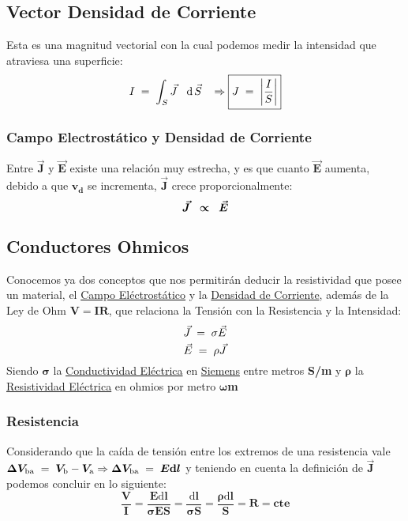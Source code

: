 \subsection{Vector Densidad de Corriente}
\noindent Esta es una magnitud vectorial con la cual podemos medir la intensidad que atraviesa una superficie:
\[
        I \hspace{1mm} = \hspace{1mm} \int_{S} \vec{J}\hspace{3mm}\mathrm{d}\hspace{.5mm}\vec{S}\hspace{3mm}\Rightarrow  \boxed{J\hspace{1mm} = \hspace{1mm} \left | \frac{I}{S} \right |}
\]
\subsubsection{Campo Electrostático y Densidad de Corriente}
\noindent Entre \(\bm{\vec{J}}\) y \(\bm{\vec{E}}\) existe una relación muy estrecha, y es que cuanto \(\bm{\vec{E}}\) aumenta, debido a que \(\bm{v_d}\) se incrementa, \(\bm{\vec{J}}\) crece proporcionalmente:
\[
        \bm{\vec{J}} \hspace{2mm} \bm{\propto} \hspace{2mm} \bm{\vec{E}}
\]
\subsection{Conductores Ohmicos}
\noindent Conocemos ya dos conceptos que nos permitirán deducir la resistividad que posee un material, el \underline{Campo Eléctrostático} y la \underline{Densidad de Corriente}, además de la Ley de Ohm \(\bm{V = IR}\), que relaciona la Tensión con la Resistencia y la Intensidad:
\[
        \vec{J} \hspace{1mm} = \hspace{1mm} \sigma \vec{E}
\]
\[
        \vec{E} \hspace{1mm} = \hspace{1mm} \rho \vec{J}
\]
Siendo \(\bm{\sigma}\) la \underline{Conductividad Eléctrica} en \underline{Siemens} entre metros \textbf{S/m} y \(\bm{\rho}\) la \underline{Resistividad Eléctrica} en ohmios por metro \(\bm{\omega}\)\textbf{m}
\subsubsection{Resistencia}
\noindent Considerando que la caída de tensión entre los extremos de una resistencia vale \\ \(\bm{\Delta V_{\textnormal{ba}}} \hspace{1mm}= \hspace{1mm} \bm{V_\textnormal{b}} -\bm{V_\textnormal{a}}  \Rightarrow \bm{\Delta V_{\textnormal{ba}}}\hspace{1mm}= \hspace{1mm} \bm{E \mathrm{d}l}\) y teniendo en cuenta la definición de \(\bm{\vec{J}}\) podemos concluir en lo siguiente:
\[
        \boxed{\bm{\frac{V}{I} = \frac{E\mathrm{d}l}{\sigma E S} = \frac{\mathrm{d}l}{\sigma S} = \frac{\rho \mathrm{d}l}{S} = R = cte}}
\]
